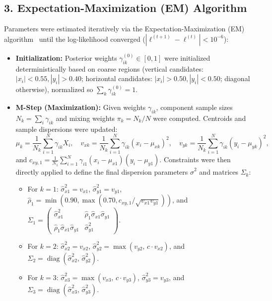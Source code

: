 \documentclass[11pt,a4paper]{article}
\begin{document}
\subsection*{3. Expectation-Maximization (EM) Algorithm}
Parameters were estimated iteratively via the Expectation-Maximization (EM) algorithm~\cite{dempster1977maximum, mclachlan2000finite} until the log-likelihood converged ($|\ell^{(t+1)} - \ell^{(t)}| < 10^{-6}$):
\begin{itemize}[noitemsep,topsep=2pt]
    \item \textbf{Initialization:} Posterior weights $\gamma_{ik}^{(0)} \in [0, 1]$ were initialized deterministically based on coarse regions (vertical candidates: $|x_i| < 0.55, |y_i| > 0.40$; horizontal candidates: $|x_i| > 0.50, |y_i| < 0.50$; diagonal otherwise), normalized so $\sum_k \gamma_{ik}^{(0)} = 1$.
    \item \textbf{M-Step (Maximization):} Given weights $\gamma_{ik}$, component sample sizes $N_k = \sum_i \gamma_{ik}$ and mixing weights $\pi_k = N_k / N$ were computed. Centroids and sample dispersions were updated:
    \begin{equation}
    \mu_k = \frac{1}{N_k}\sum_{i=1}^N \gamma_{ik} X_i, \quad v_{xk} = \frac{1}{N_k}\sum_{i=1}^N \gamma_{ik}(x_i - \mu_{xk})^2, \quad v_{yk} = \frac{1}{N_k}\sum_{i=1}^N \gamma_{ik}(y_i - \mu_{yk})^2,
    \end{equation}
    and $c_{xy,1} = \frac{1}{N_1}\sum_{i=1}^N \gamma_{i1}(x_i - \mu_{x1})(y_i - \mu_{y1})$. Constraints were then directly applied to define the final dispersion parameters $\hat{\sigma}^2$ and matrices $\Sigma_k$:
    \begin{itemize}[noitemsep,topsep=1pt]
        \item For $k=1$: $\hat{\sigma}_{x1}^2 = v_{x1}$, $\hat{\sigma}_{y1}^2 = v_{y1}$, $\hat{\rho}_1 = \min(0.90, \max(0.70, c_{xy,1}/\sqrt{v_{x1}v_{y1}}))$, and $\Sigma_1 = \begin{pmatrix} \hat{\sigma}_{x1}^2 & \hat{\rho}_1 \hat{\sigma}_{x1}\hat{\sigma}_{y1} \\ \hat{\rho}_1 \hat{\sigma}_{x1}\hat{\sigma}_{y1} & \hat{\sigma}_{y1}^2 \end{pmatrix}$.
        \item For $k=2$: $\hat{\sigma}_{x2}^2 = v_{x2}$, $\hat{\sigma}_{y2}^2 = \max(v_{y2}, \, c \cdot v_{x2})$, and $\Sigma_2 = \operatorname{diag}(\hat{\sigma}_{x2}^2, \, \hat{\sigma}_{y2}^2)$.
        \item For $k=3$: $\hat{\sigma}_{x3}^2 = \max(v_{x3}, \, c \cdot v_{y3})$, $\hat{\sigma}_{y3}^2 = v_{y3}$, and $\Sigma_3 = \operatorname{diag}(\hat{\sigma}_{x3}^2, \, \hat{\sigma}_{y3}^2)$.

\end{itemize}
\end{itemize}
\end{document}
